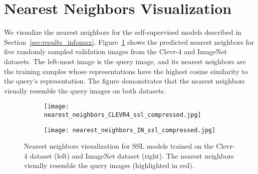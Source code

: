 \section{Nearest Neighbors Visualization} \label{app:visualization}

We visualize the nearest neighbors for the self-supervised models described in Section~\ref{sec:results_infomax}. Figure~\ref{fig:nearest_neighbors_ssl} shows the predicted nearest neighbors for five randomly sampled validation images from the Clevr-4 and ImageNet datasets. The left-most image is the query image, and its nearest neighbors are the training samples whose representations have the highest cosine similarity to the query's representation. 
The figure demonstrates that the nearest neighbors visually resemble the query images on both datasets. 

\begin{figure} %
    \centering
    \begin{subfigure}{0.495\textwidth}
        \texttt{[image: nearest\_neighbors\_CLEVR4\_ssl\_compressed.jpg]}
    \end{subfigure}
    \hfill
    \begin{subfigure}{0.495\textwidth}
        \texttt{[image: nearest\_neighbors\_IN\_ssl\_compressed.jpg]}
    \end{subfigure}%
    \caption{Nearest neighbors visualization for SSL models trained on the Clevr-4 dataset (left) and ImageNet dataset (right). The nearest neighbors visually resemble the query images (highlighted in red).}
    \label{fig:nearest_neighbors_ssl}
\end{figure}
